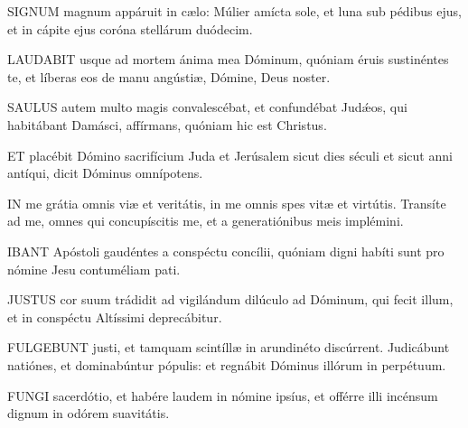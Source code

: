 
\lettrine[lines=2]{S}{IGNUM} magnum appáruit in cælo: Múlier amícta sole, et luna sub pédibus ejus, et in cápite ejus coróna stellárum duódecim.


\lettrine[lines=2]{L}{AUDABIT} usque ad mortem ánima mea Dóminum, quóniam éruis sustinéntes te, et líberas eos de manu angústiæ, Dómine, Deus noster.


\lettrine[lines=2]{S}{AULUS} autem multo magis convalescébat, et confundébat Judǽos, qui habitábant Damásci, affírmans, quóniam hic est Christus.


\lettrine[lines=2]{E}{T} placébit Dómino sacrifícium Juda et Jerúsalem sicut dies séculi et sicut anni antíqui, dicit Dóminus omnípotens.


\lettrine[lines=2]{I}{N} me grátia omnis viæ et veritátis, in me omnis spes vitæ et virtútis. Transíte ad me, omnes qui concupíscitis me, et a generatiónibus meis implémini.

\sectionornament



\lettrine[lines=2]{I}{BANT} Apóstoli gaudéntes a conspéctu concílii, quóniam digni habíti sunt pro nómine Jesu contuméliam pati.


\lettrine[lines=2]{J}{USTUS} cor suum trádidit ad vigilándum dilúculo ad Dóminum, qui fecit illum, et in conspéctu Altíssimi deprecábitur.


\lettrine[lines=2]{F}{ULGEBUNT} justi, et tamquam scintíllæ in arundinéto discúrrent. Judicábunt natiónes, et dominabúntur pópulis: et regnábit Dóminus illórum in perpétuum.


\lettrine[lines=2]{F}{UNGI} sacerdótio, et habére laudem in nómine ipsíus, et offérre illi incénsum dignum in odórem suavitátis.


